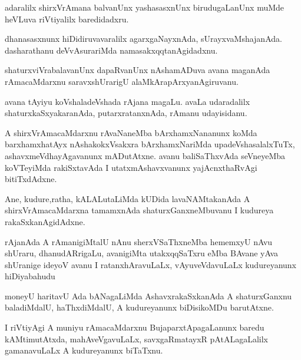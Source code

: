 \documentclass{article}
\begin{document}
\begin{mn}%
adaralilx shirxVrAmana balvanUnx yashasasxnUnx birudugaLanUnx muMde heVLuva riVtiyalilx 
baredidadxru.
\end{mn}

\begin{mn}%
dhanasasxnunx hiDidiruvavaralilx agarxgaNayxnAda, sUrayxvaMshajanAda. dasharathanu 
deVvAsurariMda namasakxqqtanAgidadxnu.
\end{mn}

\begin{mn}%
shaturxviVrabalavanUnx dapaRvanUnx nAshamADuva avana maganAda rAmacaMdarxnu 
saravxshUrarigU alaMkArapArxyanAgiruvanu.
\end{mn}

\begin{mn}%
avana tAyiyu koVshaladeVshada rAjana magaLu. avaLa udaradalilx shaturxkaSxyakaranAda, 
putarxratanxnAda, rAmanu udayisidanu.
\end{mn}

\begin{mn}%
A shirxVrAmacaMdarxnu rAvaNaneMba bArxhamxNananunx koMda barxhamxhatAyx nAshakokxVsakxra
bArxhamxNariMda upadeVshasalalxTuTx, ashavxmeVdhayAgavanunx mADutAtxne. avanu baliSaThxvAda 
seVneyeMba koVTeyiMda rakiSxtavAda I utatxmAshavxvanunx yajAcnxthaRvAgi bitiTxdAdxne.
\end{mn}

\begin{mn}%
Ane, kudure,ratha, kALALutaLiMda kUDida lavaNAMtakanAda A shirxVrAmacaMdarxna tamamxnAda 
shaturxGanxneMbuvanu I kudureya rakaSxkanAgidAdxne.
\end{mn}

\begin{mn}%
rAjanAda A rAmanigiMtalU nAnu sherxVSaThxneMba hememxyU nAvu shUraru, dhanudARrigaLu, 
avanigiMta utakxqqSaTxru eMba BAvane yAva shUranige ideyoV avanu I ratanxhAravuLaLx, 
vAyuveVdavuLaLx kudureyanunx hiDiyabahudu
\end{mn}

\begin{mn}%
moneyU haritavU Ada bANagaLiMda AshavxrakaSxkanAda A shaturxGanxnu baladiMdalU, haThxdiMdalU,
A kudureyanunx biDisikoMDu barutAtxne.
\end{mn}

\begin{mn}%
I riVtiyAgi A muniyu rAmacaMdarxnu BujaparxtApagaLanunx baredu kAMtimutAtxda, 
mahAveVgavuLaLx, savxgaRmatayxR pAtALagaLalilx gamanavuLaLx A kudureyanunx biTaTxnu.
\end{mn}
\end{document}
